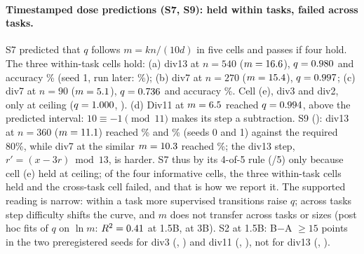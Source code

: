 \documentclass{article}
\theoremstyle{definition}
\begin{document}
\paragraph{Timestamped dose predictions (S7, S9): held within tasks, failed across tasks.} S7 predicted that $q$ follows $m=kn/(10d)$ in five cells and passes if four hold. The three within-task cells hold: (a) div13 at $n=540$ ($m=16.6$), $q=0.980$ and accuracy \divthirteenBnFiveFortysZero\% (seed 1, run later: \divthirteenBnFiveFortysOne\%); (b) div7 at $n=270$ ($m=15.4$), $q=0.997$; (c) div7 at $n=90$ ($m=5.1$), $q=0.736$ and accuracy \divsevenBnNinetysZero\%. Cell (e), div3 and div2, \SsevenCellE{} only at ceiling ($q=1.000$, \pDivtwo). (d) Div11 at $m=6.5$ reached $q=0.994$, above the predicted interval: $10\equiv-1\pmod{11}$ makes its step a subtraction. S9 (\verdictSNine): div13 at $n=360$ ($m=11.1$) reached \divthirteenBnThreeSixtysZero\% and \divthirteenBnThreeSixtysOne\% (seeds 0 and 1) against the required 80\%, while div7 at the similar $m=10.3$ reached \divsevenBnOneEighty\%; the div13 step, $r'=(x-3r)\bmod 13$, is harder. S7 thus \verdictSSeven{} by its 4-of-5 rule (\SsevenHeld/5) only because cell (e) held at ceiling; of the four informative cells, the three within-task cells held and the cross-task cell failed, and that is how we report it. The supported reading is narrow: within a task more supervised transitions raise $q$; across tasks step difficulty shifts the curve, and $m$ does not transfer across tasks or sizes (post hoc fits of $q$ on $\ln m$: $R^2=0.41$ at 1.5B, \fitRsqThreeB{} at 3B). S2 \verdictSTwo{} at 1.5B: B$-$A $\ge 15$ points in the two preregistered seeds for div3 (\divthreeBAdZero, \divthreeBAdOne) and div11 (\divelevenBAdZero, \divelevenBAdOne), not for div13 (\divthirteenBAdZero, \divthirteenBAdOne).
\end{document}
